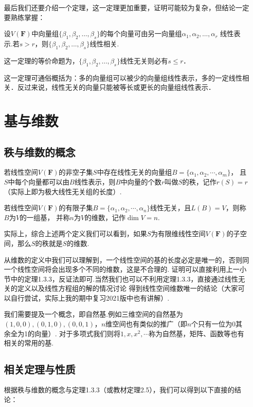 最后我们还要介绍一个定理，这一定理更加重要，证明可能较为复杂，但结论一定要熟练掌握：
\begin{theorem}\label{线性表示}
	设$V(\mathbf{F})$中向量组$\{\beta_1,\beta_2,\ldots,\beta_s\}$的每个向量可由另一向量组$\alpha_1,\alpha_2,\ldots,\alpha_r$
	线性表示.若$s>r$，则$\{\beta_1,\beta_2,\ldots,\beta_s\}$线性相关.
\end{theorem}
这一定理的等价命题为，$\{\beta_1,\beta_2,\ldots,\beta_s\}$线性无关则必有$s\le r$．

这一定理可通俗概括为：多的向量组可以被少的向量组线性表示，多的一定线性相关．反过来说，线性无关的向量只能被等长或更长的向量组线性表示．

\section{基与维数}
\subsection{秩与维数的概念}
\begin{definition}
	若线性空间$V(\mathbf{F})$的非空子集$S$中存在线性无关的向量组$B=\{\alpha_1,\alpha_2,\cdots,\alpha_m\}$，
	且$S$中每个向量都可以由$B$线性表示，则$B$中向量的个数$r$叫做$S$的秩，记作$r(S)= r$（实际上即为极大线性无关组的长度）.
\end{definition}
\begin{definition}
	若线性空间$V(\mathbf{F})$的有限子集$B=\{\alpha_1,\alpha_2,\cdots,\alpha_n\}$线性无关，且$L(B) = V$，则称$B$为$V$的一组基，
	并称$n$为$V$的维数，记作$\dim V = n$.
\end{definition}
实际上，综合上述两个定义我们可以看到，如果$S$为有限维线性空间$V(\mathbf{F})$的子空间，那么$S$的秩就是$S$的维数.

从维数的定义中我们可以理解到，一个线性空间的基的长度必定是唯一的，否则同一个线性空间将会出现多个不同的维数，这是不合理的.
证明可以直接利用上一小节中的定理1.3.3，反证法即可.当然我们也可以不利用定理1.3.3，直接通过线性无关的定义以及线性方程组的解的情况讨论
得到线性空间维数唯一的结论（大家可以自行尝试，实际上我的期中复习2021版中也有讲解）.

我们需要提及一个概念，即自然基.例如三维空间的自然基为$(1,0,0),(0,1,0),(0,0,1)$，$n$维空间也有类似的推广（即$n$个只有一位为0其余全为1的向量）.
对于多项式我们则将$1,x,x^2,\cdots$称为自然基，矩阵、函数等也有相关的常用的基.
\subsection{相关定理与性质}
根据秩与维数的概念与定理1.3.3（或教材定理2.5），我们可以得到以下直接的结论：


